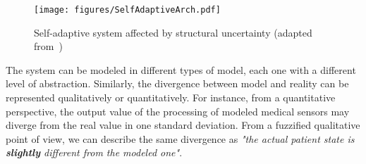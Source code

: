 \begin{figure}[!h]
	\centering
	\texttt{[image: figures/SelfAdaptiveArch.pdf]}
	\caption{Self-adaptive system affected by structural uncertainty (adapted from~\cite{weyns2017software})}
	\label{fig:SASarchitecture}
\end{figure}

The system can be modeled in different types of model, each one with a different level of abstraction. Similarly, the divergence between model and reality can be represented qualitatively or quantitatively. For instance, from a quantitative perspective, the output value of the processing of modeled medical sensors may diverge from the real value in one standard deviation. From a fuzzified qualitative point of view, we can describe the same divergence as \textit{"the actual patient state is \textbf{slightly} different from the modeled one"}.

